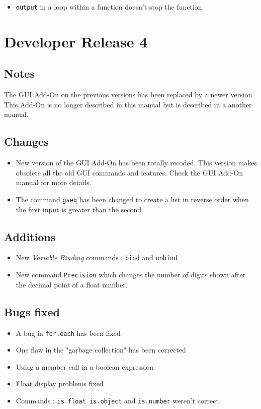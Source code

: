 \begin{itemize}
\item {\tt output} in a loop within a function doesn't stop the function.
\end{itemize}

\section{Developer Release 4}

\subsection{Notes}

The GUI Add-On on the previous versions has been replaced by a newer version. This Add-On is no longer described in this manual but is described in a another manual.

\subsection{Changes}

\begin{itemize}
\item New version of the GUI Add-On has been totally recoded. This version makes obsolete all the old GUI commands and features. Check the GUI Add-On manual for more details.
\item The command {\tt gseq} has been changed to create a list in reverse order when the first input is greater than the second. 
\end{itemize}

\subsection{Additions}

\begin{itemize}
\item New {\em Variable Binding} commands : {\tt bind} and {\tt unbind}
\item New command {\tt Precision} which changes the number of digits shown after the decimal point of a float number.
\end{itemize}

\subsection{Bugs fixed}

\begin{itemize}
\item A bug in {\tt for.each} has been fixed
\item One flaw in the "garbage collection" has been corrected
\item Using a member call in a boolean expression
\item Float display problems fixed
\item Commands : {\tt is.float is.object} and {\tt is.number} weren't correct.
\end{itemize}

